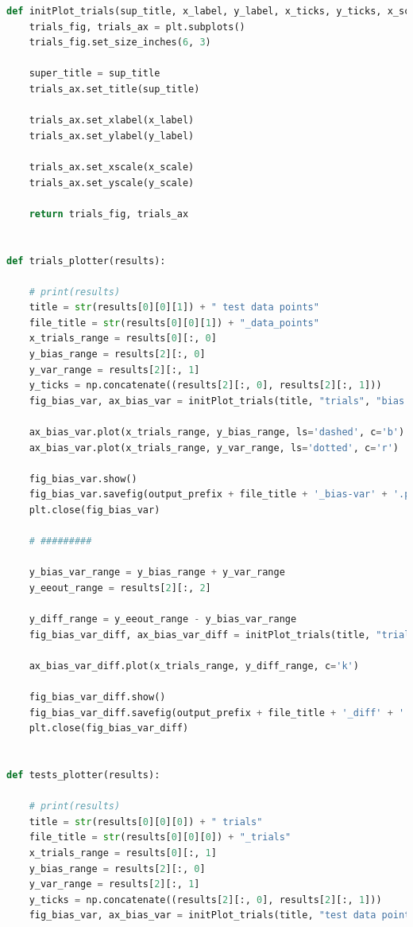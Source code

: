 \documentclass[12pt]{article}
\begin{document}
\begin{lstlisting}[language=Python, caption=experiment\_printer.py]
def initPlot_trials(sup_title, x_label, y_label, x_ticks, y_ticks, x_scale, y_scale):
    trials_fig, trials_ax = plt.subplots()
    trials_fig.set_size_inches(6, 3)

    super_title = sup_title
    trials_ax.set_title(sup_title)

    trials_ax.set_xlabel(x_label)
    trials_ax.set_ylabel(y_label)

    trials_ax.set_xscale(x_scale)
    trials_ax.set_yscale(y_scale)

    return trials_fig, trials_ax


def trials_plotter(results):

    # print(results)
    title = str(results[0][0][1]) + " test data points"
    file_title = str(results[0][0][1]) + "_data_points"
    x_trials_range = results[0][:, 0]
    y_bias_range = results[2][:, 0]
    y_var_range = results[2][:, 1]
    y_ticks = np.concatenate((results[2][:, 0], results[2][:, 1]))
    fig_bias_var, ax_bias_var = initPlot_trials(title, "trials", "bias (dashed), var (dotted)", x_trials_range, y_ticks, "log", "linear")

    ax_bias_var.plot(x_trials_range, y_bias_range, ls='dashed', c='b')
    ax_bias_var.plot(x_trials_range, y_var_range, ls='dotted', c='r')

    fig_bias_var.show()
    fig_bias_var.savefig(output_prefix + file_title + '_bias-var' + '.png', transparent=False, dpi=80, bbox_inches="tight")
    plt.close(fig_bias_var)

    # #########

    y_bias_var_range = y_bias_range + y_var_range
    y_eeout_range = results[2][:, 2]

    y_diff_range = y_eeout_range - y_bias_var_range
    fig_bias_var_diff, ax_bias_var_diff = initPlot_trials(title, "trials", "E[E_out] - bias + var ", x_trials_range, y_diff_range, "log", "linear")

    ax_bias_var_diff.plot(x_trials_range, y_diff_range, c='k')

    fig_bias_var_diff.show()
    fig_bias_var_diff.savefig(output_prefix + file_title + '_diff' + '.png', transparent=False, dpi=80, bbox_inches="tight")
    plt.close(fig_bias_var_diff)


def tests_plotter(results):

    # print(results)
    title = str(results[0][0][0]) + " trials"
    file_title = str(results[0][0][0]) + "_trials"
    x_trials_range = results[0][:, 1]
    y_bias_range = results[2][:, 0]
    y_var_range = results[2][:, 1]
    y_ticks = np.concatenate((results[2][:, 0], results[2][:, 1]))
    fig_bias_var, ax_bias_var = initPlot_trials(title, "test data points", "bias (dashed), var (dotted)", x_trials_range, y_ticks, "log", "linear")


\end{lstlisting}
\end{document}

